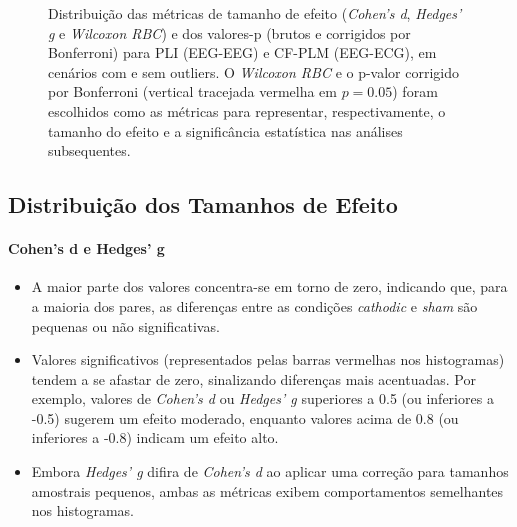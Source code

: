 \begin{figure}[htb]
{    }
    \quad
    \caption[Distribuições de tamanhos de efeito e valores-p]{Distribuição das métricas de tamanho de efeito (\emph{Cohen's d}, \emph{Hedges' g} e \emph{Wilcoxon RBC}) e dos valores-p (brutos e corrigidos por Bonferroni) para PLI (EEG-EEG) e CF-PLM (EEG-ECG), em cenários com e sem outliers. O \emph{Wilcoxon RBC} e o p-valor corrigido por Bonferroni (vertical tracejada vermelha em $p=0.05$) foram escolhidos como as métricas para representar, respectivamente, o tamanho do efeito e a significância estatística nas análises subsequentes.}
    \label{fig:effectsizehist_all}    
\end{figure}

\subsection{Distribuição dos Tamanhos de Efeito}
\paragraph{Cohen's d e Hedges' g}
\begin{itemize}
    \item A maior parte dos valores concentra-se em torno de zero, indicando que, para a maioria dos pares, as diferenças entre as condições \textit{cathodic} e \textit{sham} são pequenas ou não significativas.
    \item Valores significativos (representados pelas barras vermelhas nos histogramas) tendem a se afastar de zero, sinalizando diferenças mais acentuadas. Por exemplo, valores de \emph{Cohen's d} ou \emph{Hedges' g} superiores a 0.5 (ou inferiores a -0.5) sugerem um efeito moderado, enquanto valores acima de 0.8 (ou inferiores a -0.8) indicam um efeito alto.
    \item Embora \emph{Hedges' g} difira de \emph{Cohen's d} ao aplicar uma correção para tamanhos amostrais pequenos, ambas as métricas exibem comportamentos semelhantes nos histogramas.
\end{itemize}


